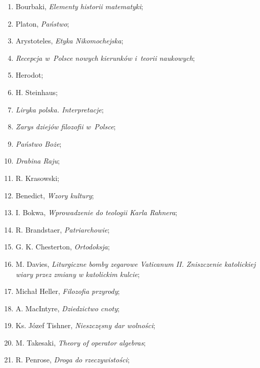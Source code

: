 \documentclass[a4paper,11pt]{article}
\begin{document}
\begin{enumerate}
\item Bourbaki, \emph{Elementy historii matematyki};

\item Platon, \emph{Państwo};

\item Arystoteles, \emph{Etyka Nikomochejska};

\item \emph{Recepcja w~Polsce nowych kierunków i~teorii naukowych};

\item Herodot;

\item H. Steinhaus;

\item \emph{Liryka polska. Interpretacje};

\item \emph{Zarys dziejów filozofii w~Polsce};

\item \emph{Państwo Boże};

\item \emph{Drabina Raju};

\item R. Krasowski;

\item Benedict, \emph{Wzory kultury};

\item I. Bokwa, \emph{Wprowadzenie do teologii Karla Rahnera};

\item R. Brandstaer, \emph{Patriarchowie};

\item G. K. Chesterton, \emph{Ortodoksja};

\item M. Davies, \emph{Liturgiczne bomby zegarowe Vaticanum II.
    Zniszczenie katolickiej wiary przez zmiany w katolickim kulcie};

\item Michał Heller, \emph{Filozofia przyrody};

\item A. MacIntyre, \emph{Dziedzictwo cnoty};

\item Ks. Józef Tishner, \emph{Nieszczęsny dar wolności};

\item M. Takesaki, \emph{Theory of operator algebras};

\item R. Penrose, \emph{Droga do rzeczywistości};


\end{enumerate}
\end{document}
